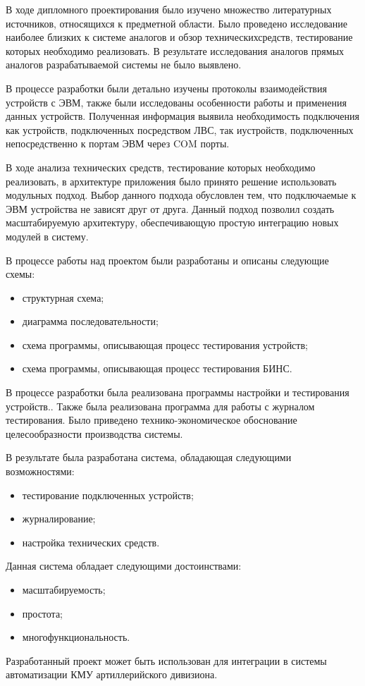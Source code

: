 
В ходе дипломного проектирования было изучено множество литературных источников, относящихся к предметной области. Было
проведено исследование наиболее близких к системе аналогов и обзор технических\break средств, тестирование которых необходимо
реализовать. В результате исследования аналогов прямых аналогов разрабатываемой системы не было выявлено.

В процессе разработки были детально изучены протоколы взаимодействия устройств с ЭВМ, также были исследованы особенности
работы и применения данных устройств. Полученная информация выявила необходимость подключения как устройств,
подключенных посредством ЛВС, так и\break устройств, подключенных непосредственно к портам ЭВМ через COM порты.

В ходе анализа технических средств, тестирование которых необходимо реализовать, в архитектуре приложения было
принято решение использовать модульных подход. Выбор данного подхода обусловлен тем, что подключаемые к ЭВМ
устройства не зависят друг от друга. Данный подход позволил создать масштабируемую архитектуру, обеспечивающую простую
интеграцию новых модулей в систему.

В процессе работы над проектом были разработаны и описаны следующие схемы:
\begin{itemize}
	\item структурная схема;
	\item диаграмма последовательности;
	\item схема программы, описывающая процесс тестирования устройств;
	\item схема программы, описывающая процесс тестирования БИНС.
\end{itemize}

В процессе разработки была реализована программы настройки и тестирования устройств..
Также была реализована программа для работы с журналом тестирования. Было приведено технико-экономическое обоснование
целесообразности производства системы.

В результате была разработана система, обладающая следующими возможностями:
\begin{itemize}
	\item тестирование подключенных устройств;
	\item журналирование;
	\item настройка технических средств.
\end{itemize}

Данная система обладает следующими достоинствами:
\begin{itemize}
	\item масштабируемость;
	\item простота;
	\item многофункциональность.
\end{itemize}

Разработанный проект может быть использован для интеграции в системы автоматизации КМУ артиллерийского дивизиона.
